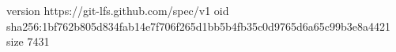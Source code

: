 version https://git-lfs.github.com/spec/v1
oid sha256:1bf762b805d834fab14e7f706f265d1bb5b4fb35c0d9765d6a65c99b3e8a4421
size 7431
